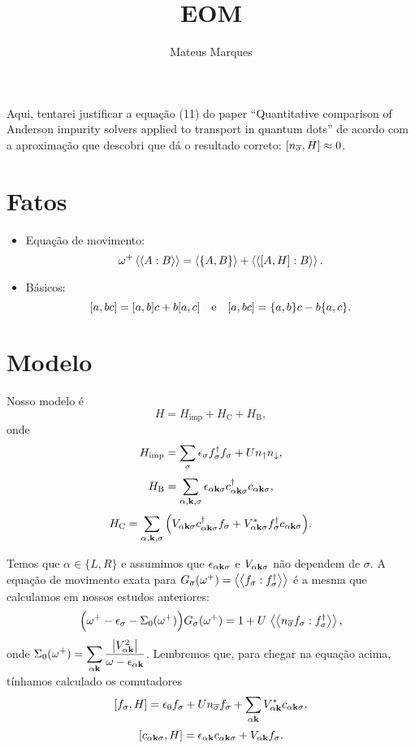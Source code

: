 \documentclass[a4paper,fleqn,12pt]{article}
\title{\Huge{\textbf{EOM}}}
\author{Mateus Marques}
\begin{document}
\maketitle

Aqui, tentarei justificar a equação (11) do paper ``Quantitative comparison of Anderson impurity solvers applied to transport in quantum dots'' de acordo com a aproximação que descobri que dá o resultado correto: $[n_{\overline{\sigma}}, H] \approx 0$.

\section{Fatos}

\begin{itemize}
\item Equação de movimento:
$$
\omega^+ \gf{A}{B} = \ev{\{ A, B\}} + \gf{[A, H]}{B}.
$$
\item Básicos:
$$
[a, bc] = [a, b] c + b [a, c] \quad \mathrm{e} \quad [a, bc] = \{a, b\} c - b \{a, c\}.
$$
\end{itemize}

\section{Modelo}

Nosso modelo é
$$
H = H_{\text{imp}} + H_{\text{C}} + H_{\text{B}},
$$
onde
$$
H_{\text{imp}} = \sum_\sigma \epsilon_\sigma f_\sigma^\dagger f_\sigma +
U n_\uparrow n_\downarrow,
$$
$$
H_{\text{B}} = \sum_{\alpha, \vb{k}, \sigma} \epsilon_{\alpha \vb{k} \sigma}
c_{\alpha \vb{k} \sigma}^\dagger c_{\alpha \vb{k} \sigma},
$$
$$
H_{\text{C}} = \sum_{\alpha, \vb{k}, \sigma} \Big(
V_{\alpha \vb{k} \sigma} c^\dagger_{\alpha \vb{k} \sigma} f_\sigma +
V_{\alpha \vb{k} \sigma}^* f^\dagger_\sigma  c_{\alpha \vb{k} \sigma}
\Big).
$$

Temos que $\alpha \in \{L, R\}$ e assumimos que $\epsilon_{\alpha \vb{k} \sigma}$ e $V_{\alpha \vb{k} \sigma}$ não dependem de $\sigma$. A equação de movimento exata para $G_\sigma(\omega^+) = \gf{f_\sigma}{f_\sigma^\dagger}$ é a mesma que calculamos em nossos estudos anteriores:
$$
\Big(
\omega^+ - \eps_\sigma - \Sigma_0(\omega^+)
\Big) G_\sigma(\omega^+)
= 1 + U \, \gf{n_{\cc{\sigma}} f_\sigma}{f_\sigma^\dagger},
$$
onde $\displaystyle{\Sigma_0(\omega^+) = \sum_{\alpha \vb{k}} \frac{\abs{V_{\alpha \vb{k}}^2}}{\omega - \epsilon_{\alpha \vb{k}}}}$. Lembremos que, para chegar na equação acima, tínhamos calculado os comutadores
$$
[f_\sigma, H] = \epsilon_0  f_\sigma + U n_{\overline{\sigma}} f_\sigma +
\sum_{\alpha \vb{k}} V_{\alpha \vb{k}}^* c_{\alpha \vb{k} \sigma},
$$
$$
[c_{\alpha \vb{k} \sigma}, H] = \epsilon_{\alpha \vb{k}} c_{\alpha \vb{k} \sigma} +
V_{\alpha \vb{k}} f_\sigma.
$$
\end{document}
